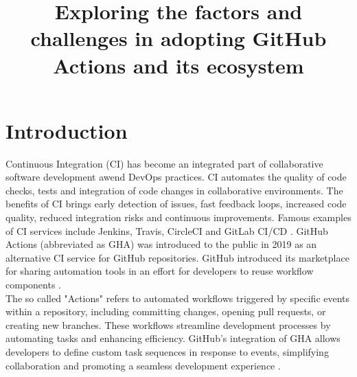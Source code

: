 \documentclass[conference]{IEEEtran}
\begin{document}
\title{Exploring the factors and challenges in adopting GitHub Actions and its ecosystem\\}

\author{
\and
{}
}

\maketitle

\section{Introduction}
    Continuous Integration (CI) has become an integrated part of collaborative software development awend DevOps practices. CI automates the quality of code checks, tests and integration of code changes in collaborative environments. The benefits of CI brings early detection of issues, fast feedback loops, increased code quality, reduced integration risks and continuous improvements. Famous examples of CI services include Jenkins, Travis, CircleCI and GitLab CI/CD \cite{dabbish2012social}. GitHub Actions (abbreviated as GHA) was introduced to the public in 2019 as an alternative CI service for GitHub repositories. GitHub introduced its marketplace for sharing automation tools in an effort for developers to reuse workflow components \cite{saroar2023developers}. \\ 

    The so called "Actions" refers to automated workflows triggered by specific events within a repository, including committing changes, opening pull requests, or creating new branches. These workflows streamline development processes by automating tasks and enhancing efficiency. GitHub's integration of GHA allows developers to define custom task sequences in response to events, simplifying collaboration and promoting a seamless development experience \cite{chandrasekara2021getting}. \\
\end{document}
